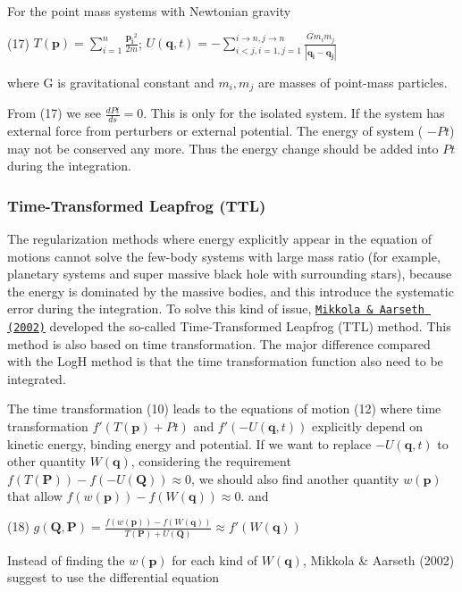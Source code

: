 For the point mass systems with Newtonian gravity

(17) $ T(\mathbf{p}) = \sum_{i=1}^{n} \frac{\mathbf{p_i}^2}{2m} $; $ U(\mathbf{q},t) = - \sum_{i<j,i=1,j=1}^{i\rightarrow n,j\rightarrow n} \frac{G m_i m_j}{|\mathbf{q_i}-\mathbf{q_j}|} $

where G is gravitational constant and $ m_i, m_j $ are masses of point-\/mass particles.

From (17) we see $ \frac{d Pt}{d s} = 0 $. This is only for the isolated system. If the system has external force from perturbers or external potential. The energy of system ( $-Pt$) may not be conserved any more. Thus the energy change should be added into $Pt$ during the integration.\hypertarget{index_TTL_sec}{}\subsubsection{Time-\/\+Transformed Leapfrog (\+T\+T\+L)}\label{index_TTL_sec}
The regularization methods where energy explicitly appear in the equation of motions cannot solve the few-\/body systems with large mass ratio (for example, planetary systems and super massive black hole with surrounding stars), because the energy is dominated by the massive bodies, and this introduce the systematic error during the integration. To solve this kind of issue, \href{http://adsabs.harvard.edu/abs/2002CeMDA..84..343M}{\tt Mikkola \& Aarseth (2002)} developed the so-\/called Time-\/\+Transformed Leapfrog (T\+TL) method. This method is also based on time transformation. The major difference compared with the LogH method is that the time transformation function also need to be integrated.

The time transformation (10) leads to the equations of motion (12) where time transformation $ f'(T(\mathbf{p})+Pt) $ and $ f'(-U(\mathbf{q},t))$ explicitly depend on kinetic energy, binding energy and potential. If we want to replace $ -U(\mathbf{q},t) $ to other quantity $ W(\mathbf{q})$, considering the requirement $ f(T(\mathbf{P})) - f(-U(\mathbf{Q})) \approx 0 $, we should also find another quantity $ w(\mathbf{p}) $ that allow $ f(w(\mathbf{p})) - f(W(\mathbf{q})) \approx 0 $. and

(18) $ g(\mathbf{Q},\mathbf{P}) = \frac{f(w(\mathbf{p})) - f(W(\mathbf{q}))}{T(\mathbf{P}) + U(\mathbf{Q})} \approx f'(W(\mathbf{q})) $

Instead of finding the $ w(\mathbf{p}) $ for each kind of $ W(\mathbf{q})$, Mikkola \& Aarseth (2002) suggest to use the differential equation

